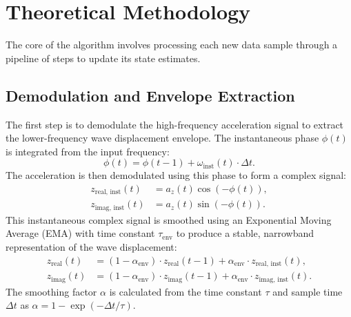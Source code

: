 \documentclass[11pt]{article}
\begin{document}
\section{Theoretical Methodology}
The core of the algorithm involves processing each new data sample through a pipeline of steps to update its state estimates.

\subsection{Demodulation and Envelope Extraction}
The first step is to demodulate the high-frequency acceleration signal to extract the lower-frequency wave displacement envelope. The instantaneous phase $\phi(t)$ is integrated from the input frequency:
\begin{equation}
\phi(t) = \phi(t-1) + \omega_{\text{inst}}(t) \cdot \Delta t.
\end{equation}
The acceleration is then demodulated using this phase to form a complex signal:
\begin{align}
z_{\text{real, inst}}(t) &= a_z(t)\cos(-\phi(t)), \\
z_{\text{imag, inst}}(t) &= a_z(t)\sin(-\phi(t)).
\end{align}
This instantaneous complex signal is smoothed using an Exponential Moving Average (EMA) with time constant $\tau_{\text{env}}$ to produce a stable, narrowband representation of the wave displacement:
\begin{align}
z_{\text{real}}(t) &= (1 - \alpha_{\text{env}}) \cdot z_{\text{real}}(t-1) + \alpha_{\text{env}} \cdot z_{\text{real, inst}}(t), \\
z_{\text{imag}}(t) &= (1 - \alpha_{\text{env}}) \cdot z_{\text{imag}}(t-1) + \alpha_{\text{env}} \cdot z_{\text{imag, inst}}(t).
\end{align}
The smoothing factor $\alpha$ is calculated from the time constant $\tau$ and sample time $\Delta t$ as $\alpha = 1 - \exp(-\Delta t / \tau)$.
\end{document}
